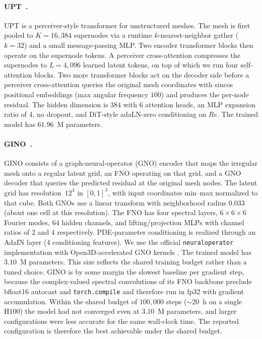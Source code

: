 \documentclass{article}
\begin{document}
\paragraph{UPT~\citep{Alkin2024}.} UPT is a perceiver-style transformer for unstructured meshes. The mesh is first pooled to $K=16{,}384$ supernodes via a runtime $k$-nearest-neighbor gather ($k=32$) and a small message-passing MLP. Two encoder transformer blocks then operate on the supernode tokens. A perceiver cross-attention compresses the supernodes to $L=4{,}096$ learned latent tokens, on top of which we run four self-attention blocks. Two more transformer blocks act on the decoder side before a perceiver cross-attention queries the original mesh coordinates with sincos positional embeddings (max angular frequency $100$) and produces the per-node residual. The hidden dimension is $384$ with $6$ attention heads, an MLP expansion ratio of $4$, no dropout, and DiT-style adaLN-zero conditioning on $Re$. The trained model has $61.96$~M parameters.                                                          

\paragraph{GINO~\citep{li2023geometry}.} GINO consists of a graph-neural-operator (GNO) encoder that maps the irregular mesh onto a regular latent grid, an FNO operating on that grid, and a GNO decoder that queries the predicted residual at the original mesh nodes. The latent grid has resolution~$12^3$ in $[0,1]^3$, with input coordinates min--max normalized to that cube. Both GNOs use a linear transform with neighborhood radius $0.033$ (about one cell at this resolution). The FNO has four spectral layers, $6{\times}6{\times}6$ Fourier modes, $64$ hidden channels, and lifting/projection MLPs with channel ratios of $2$ and $4$ respectively. PDE-parameter conditioning is realized through an AdaIN layer ($4$ conditioning features). We use the official \texttt{neuraloperator} implementation with Open3D-accelerated GNO kernels \citep{kossaifi2025librarylearningneuraloperators}. The trained model has $3.10$~M parameters. \textcolor{revcolor}{This size reflects the shared training budget rather than a tuned choice. GINO is by some margin the slowest baseline per gradient step, because the complex-valued spectral convolutions of its FNO backbone preclude bfloat16 autocast and \texttt{torch.compile} and therefore run in fp32 with gradient accumulation. Within the shared budget of $100{,}000$ steps ($\sim$20~h on a single H100) the model had not converged even at $3.10$~M parameters, and larger configurations were less accurate for the same wall-clock time. The reported configuration is therefore the best achievable under the shared budget.}
                                                         
\end{document}
